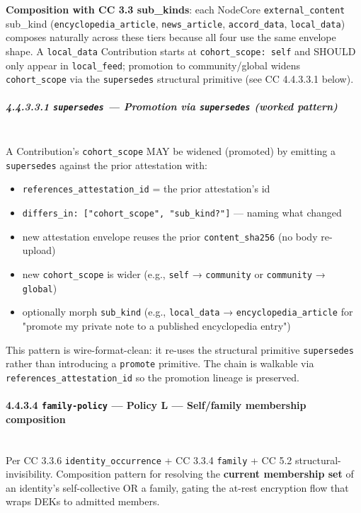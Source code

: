 \documentclass[11pt]{article}
\begin{document}
\textbf{Composition with CC 3.3 sub\_kinds}: each NodeCore \texttt{external\_content} sub\_kind (\texttt{encyclopedia\_article}, \texttt{news\_article}, \texttt{accord\_data}, \texttt{local\_data}) composes naturally across these tiers because all four use the same envelope shape. A \texttt{local\_data} Contribution starts at \texttt{cohort\_scope: self} and SHOULD only appear in \texttt{local\_feed}; promotion to community/global widens \texttt{cohort\_scope} via the \texttt{supersedes} structural primitive (see CC 4.4.3.3.1 below).


\subparagraph{4.4.3.3.1 \texttt{supersedes} — Promotion via \texttt{supersedes} (worked pattern)}\mbox{}\\


A Contribution's \texttt{cohort\_scope} MAY be widened (promoted) by emitting a \texttt{supersedes} against the prior attestation with:


\begin{itemize}\setlength\itemsep{0pt}
\item \texttt{references\_attestation\_id} = the prior attestation's id
\item \texttt{differs\_in: ["cohort\_scope", "sub\_kind?"]} — naming what changed
\item new attestation envelope reuses the prior \texttt{content\_sha256} (no body re-upload)
\item new \texttt{cohort\_scope} is wider (e.g., \texttt{self} → \texttt{community} or \texttt{community} → \texttt{global})
\item optionally morph \texttt{sub\_kind} (e.g., \texttt{local\_data} → \texttt{encyclopedia\_article} for "promote my private note to a published encyclopedia entry")
\end{itemize}


This pattern is wire-format-clean: it re-uses the structural primitive \texttt{supersedes} rather than introducing a \texttt{promote} primitive. The chain is walkable via \texttt{references\_attestation\_id} so the promotion lineage is preserved.


\paragraph{4.4.3.4 \texttt{family-policy} — Policy L — Self/family membership composition}\mbox{}\\


Per CC 3.3.6 \texttt{identity\_occurrence} + CC 3.3.4 \texttt{family} + CC 5.2 structural-invisibility. Composition pattern for resolving the \textbf{current membership set} of an identity's self-collective OR a family, gating the at-rest encryption flow that wraps DEKs to admitted members.
\end{document}
